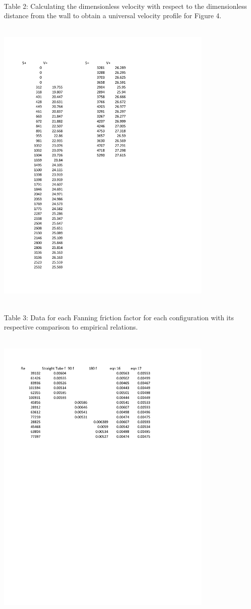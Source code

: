 \documentclass{article}
\begin{document}
\caption{\label{fig1}\\ Table 2: Calculating the dimensionless velocity with respect to the dimensionless distance from the wall to obtain a universal velocity profile for Figure 4.}
\linebreak \\ 
\centering\includegraphics[width=0.8\textwidth]{images/table_2.pdf}\raggedright

\caption{\label{fig1}\\ Table 3: Data for each Fanning friction factor for each configuration with its respective comparison to empirical relations.}
\linebreak \\ 
\centering\includegraphics[width=0.8\textwidth]{images/table_1.pdf}\raggedright
\end{document}

